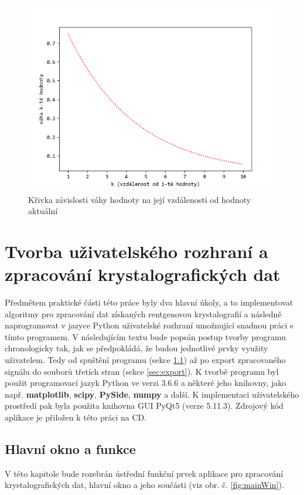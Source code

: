 \documentclass[a4paper, 12pt]{article}
\begin{document}
\begin{figure}[hbt!]
    \centering
    \includegraphics[width=0.9\linewidth]{EMAexp1.png}
    \caption{Křivka závislosti váhy hodnoty na její vzdálenosti od hodnoty aktuální}
    \label{fig:EMAexp}
\end{figure}

\clearpage
\section{Tvorba uživatelského rozhraní a zpracování krystalografických dat}
Předmětem praktické části této práce byly dva hlavní úkoly, a to implementovat algoritmy pro zpracování dat získaných rentgenovou krystalografií a následně naprogramovat v jazyce Python uživatelské rozhraní umožnující snadnou práci s tímto programem. V následujícím textu bude popsán postup tvorby programu chronologicky tak, jak se předpokládá, že budou jednotlivé prvky využity uživatelem. Tedy od spuštění programu (sekce \ref{sec:mainwin}) až po export zpracovaného signálu do souborů třetích stran (sekce \ref{sec:export}). K tvorbě programu byl použit programovací jazyk Python ve verzi 3.6.6 a některé jeho knihovny, jako např. \textbf{matplotlib}, \textbf{scipy}, \textbf{PySide}, \textbf{numpy} a další. K implementaci uživatelského prostředí pak byla použita knihovna GUI PyQt5 (verze 5.11.3). Zdrojový kód aplikace je přiložen k této práci na CD.

\subsection{Hlavní okno a funkce} \label{sec:mainwin}
V této kapitole bude rozebrán ústřední funkční prvek aplikace pro zpracování krystalografických dat, hlavní okno a jeho součásti (viz obr. č. \ref{fig:mainWin}).
\end{document}
